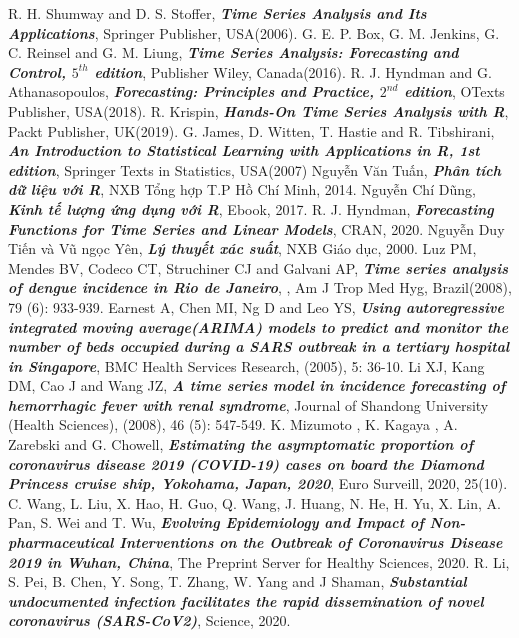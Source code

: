 \documentclass[12pt, a4paper,oneside]{book}
\theoremstyle{definition}
\begin{document}
\begin{thebibliography}{99}
	 R. H. Shumway and D. S. Stoffer, \textbf{\textit{Time Series Analysis and Its Applications}}, Springer Publisher, USA(2006).
	 G. E. P. Box, G. M. Jenkins, G. C. Reinsel and G. M. Liung, \textbf{\textit{Time Series Analysis: Forecasting and Control, $5^{th}$ edition}}, Publisher Wiley, Canada(2016).
	 R. J. Hyndman and G. Athanasopoulos, \textbf{\textit{Forecasting: Principles and Practice, $2^{nd}$ edition}}, OTexts Publisher, USA(2018).
	 R. Krispin,  \textbf{\textit{Hands-On Time Series Analysis with R}}, Packt Publisher, UK(2019). 	
	 G. James, D. Witten, T. Hastie and R. Tibshirani, \textbf{\textit{An Introduction to Statistical Learning with Applications in R, 1st edition}}, Springer Texts in Statistics, USA(2007)
	 Nguyễn Văn Tuấn,  \textbf{\textit{Phân tích dữ liệu với R}}, NXB Tổng hợp T.P Hồ Chí Minh, 2014.
	 Nguyễn Chí Dũng, \textbf{\textit{Kinh tế lượng ứng dụng với R}}, Ebook, 2017.
	 R. J. Hyndman, \textbf{\textit{Forecasting Functions for Time Series and Linear Models}}, CRAN, 2020.
	 Nguyễn Duy Tiến và Vũ ngọc Yên, \textbf{\textit{Lý thuyết xác suất}}, NXB Giáo dục, 2000.
	 Luz PM, Mendes BV, Codeco CT, Struchiner CJ and Galvani AP, \textbf{\textit{Time series analysis of dengue incidence in Rio de Janeiro}}, , Am J Trop Med Hyg, Brazil(2008), 79 (6): 933-939.
	 Earnest A, Chen MI, Ng D and Leo YS, \textbf{\textit{Using autoregressive integrated moving average(ARIMA) models to predict and monitor the number of beds occupied during a SARS outbreak in a tertiary hospital in Singapore}}, BMC Health Services Research, (2005), 5: 36-10.
	  Li XJ, Kang DM, Cao J and Wang JZ, \textbf{\textit{A time series model in incidence forecasting of hemorrhagic fever with renal syndrome}}, Journal of Shandong University (Health Sciences), (2008), 46 (5): 547-549.
	  K. Mizumoto , K. Kagaya , A. Zarebski and G. Chowell, \textbf{\textit{Estimating the asymptomatic proportion of coronavirus disease 2019 (COVID-19) cases on board the Diamond Princess cruise ship, Yokohama, Japan, 2020}},  Euro Surveill, 2020, 25(10).
	 C. Wang, L. Liu, X. Hao, H. Guo, Q. Wang, J. Huang, N. He, H. Yu, X. Lin, A. Pan, S. Wei and T. Wu, \textbf{\textit{Evolving Epidemiology and Impact of Non-pharmaceutical Interventions on the Outbreak of Coronavirus Disease 2019 in Wuhan, China}}, The Preprint Server for Healthy Sciences, 2020.
	 R. Li, S. Pei, B. Chen, Y. Song, T. Zhang, W. Yang and J Shaman, \textbf{\textit{Substantial undocumented infection facilitates the rapid dissemination of novel coronavirus (SARS-CoV2)}}, Science, 2020.

\end{thebibliography}
\end{document}
